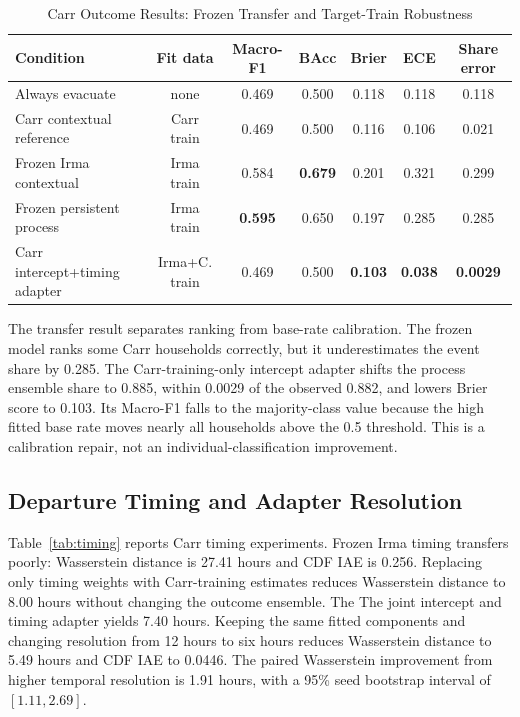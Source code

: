 \documentclass[journal]{IEEEtran}
\begin{document}
\begin{table}[!t]
\caption{Carr Outcome Results: Frozen Transfer and Target-Train Robustness}
\label{tab:carr-outcome}
\centering
\small
\begin{tabular}{lcccccc}
\toprule
Condition & Fit data & Macro-F1 & BAcc & Brier & ECE & Share error\\
\midrule
Always evacuate & none & 0.469 & 0.500 & 0.118 & 0.118 & 0.118\\
Carr contextual reference & Carr train & 0.469 & 0.500 & 0.116 & 0.106 & 0.021\\
Frozen Irma contextual & Irma train & 0.584 & \textbf{0.679} & 0.201 & 0.321 & 0.299\\
Frozen persistent process & Irma train & \textbf{0.595} & 0.650 & 0.197 & 0.285 & 0.285\\
Carr intercept+timing adapter & Irma+C. train & 0.469 & 0.500 &
\textbf{0.103} & \textbf{0.038} & \textbf{0.0029}\\
\bottomrule
\end{tabular}
\end{table}

The transfer result separates ranking from base-rate calibration. The frozen
model ranks some Carr households correctly, but it underestimates the event
share by 0.285. The Carr-training-only intercept adapter shifts the process
ensemble share to 0.885, within 0.0029 of the observed 0.882, and lowers Brier
score to 0.103. Its Macro-F1 falls to the majority-class value because the
high fitted base rate moves nearly all households above the 0.5 threshold.
This is a calibration repair, not an individual-classification improvement.

\subsection{Departure Timing and Adapter Resolution}
Table~\ref{tab:timing} reports Carr timing experiments. Frozen Irma timing
transfers poorly: Wasserstein distance is 27.41 hours and CDF IAE is 0.256.
Replacing only timing weights with Carr-training estimates reduces
Wasserstein distance to 8.00 hours without changing the outcome ensemble. The
The joint intercept and timing adapter yields 7.40 hours. Keeping the same
fitted components and changing resolution from 12 hours to six hours reduces
Wasserstein distance to 5.49 hours and CDF IAE to 0.0446. The paired
Wasserstein improvement from higher temporal resolution is 1.91 hours, with a
95\% seed bootstrap interval of $[1.11,2.69]$.
\end{document}
